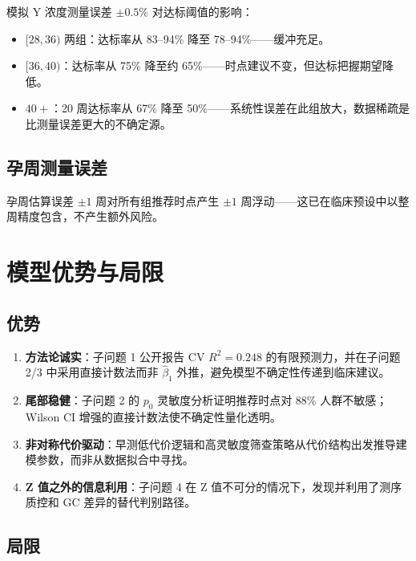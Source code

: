 \documentclass{mcm-paper}
\begin{document}
模拟 Y 浓度测量误差 $\pm 0.5\%$ 对达标阈值的影响：
\begin{itemize}
    \item $[28,36)$ 两组：达标率从 83--94\% 降至 78--94\%——缓冲充足。
    \item $[36,40)$：达标率从 75\% 降至约 65\%——时点建议不变，但达标把握期望降低。
    \item $40+$：20 周达标率从 67\% 降至 50\%——系统性误差在此组放大，数据稀疏是比测量误差更大的不确定源。
\end{itemize}

\subsection{孕周测量误差}

孕周估算误差 $\pm 1$ 周对所有组推荐时点产生 $\pm 1$ 周浮动——这已在临床预设中以整周精度包含，不产生额外风险。

\section{模型优势与局限}

\subsection{优势}

\begin{enumerate}
    \item \textbf{方法论诚实}：子问题 1 公开报告 CV $R^2=0.248$ 的有限预测力，并在子问题 2/3 中采用直接计数法而非 $\hat{\beta}_1$ 外推，避免模型不确定性传递到临床建议。
    \item \textbf{尾部稳健}：子问题 2 的 $p_0$ 灵敏度分析证明推荐时点对 88\% 人群不敏感；Wilson CI 增强的直接计数法使不确定性量化透明。
    \item \textbf{非对称代价驱动}：早测低代价逻辑和高灵敏度筛查策略从代价结构出发推导建模参数，而非从数据拟合中寻找。
    \item \textbf{Z 值之外的信息利用}：子问题 4 在 Z 值不可分的情况下，发现并利用了测序质控和 GC 差异的替代判别路径。
\end{enumerate}

\subsection{局限}
\end{document}

